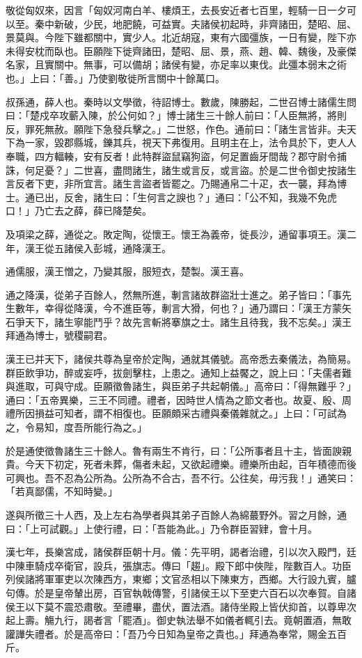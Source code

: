 \begin{pinyinscope}
敬從匈奴來，因言「匈奴河南白羊、樓煩王，去長安近者七百里，輕騎一日一夕可以至。秦中新破，少民，地肥饒，可益實。夫諸侯初起時，非齊諸田，楚昭、屈、景莫與。今陛下雖都關中，實少人。北近胡寇，東有六國彊族，一日有變，陛下亦未得安枕而臥也。臣願陛下徙齊諸田，楚昭、屈、景，燕、趙、韓、魏後，及豪傑名家，且實關中。無事，可以備胡；諸侯有變，亦足率以東伐。此彊本弱末之術也。」上曰：「善。」乃使劉敬徙所言關中十餘萬口。

叔孫通，薛人也。秦時以文學徵，待詔博士。數歲，陳勝起，二世召博士諸儒生問曰：「楚戍卒攻蘄入陳，於公何如？」博士諸生三十餘人前曰：「人臣無將，將則反，罪死無赦。願陛下急發兵擊之。」二世怒，作色。通前曰：「諸生言皆非。夫天下為一家，毀郡縣城，鑠其兵，視天下弗復用。且明主在上，法令具於下，吏人人奉職，四方輻輳，安有反者！此特群盜鼠竊狗盜，何足置齒牙間哉？郡守尉令捕誅，何足憂？」二世喜，盡問諸生，諸生或言反，或言盜。於是二世令御史按諸生言反者下吏，非所宜言。諸生言盜者皆罷之。乃賜通帛二十疋，衣一襲，拜為博士。通已出，反舍，諸生曰：「生何言之諛也？」通曰：「公不知，我幾不免虎口！」乃亡去之薛，薛已降楚矣。

及項梁之薛，通從之。敗定陶，從懷王。懷王為義帝，徙長沙，通留事項王。漢二年，漢王從五諸侯入彭城，通降漢王。

通儒服，漢王憎之，乃變其服，服短衣，楚製。漢王喜。

通之降漢，從弟子百餘人，然無所進，剸言諸故群盜壯士進之。弟子皆曰：「事先生數年，幸得從降漢，今不進臣等，剸言大猾，何也？」通乃謂曰：「漢王方蒙矢石爭天下，諸生寧能鬥乎？故先言斬將搴旗之士。諸生且待我，我不忘矣。」漢王拜通為博士，號稷嗣君。

漢王已并天下，諸侯共尊為皇帝於定陶，通就其儀號。高帝悉去秦儀法，為簡易。群臣飲爭功，醉或妄呼，拔劍擊柱，上患之。通知上益饜之，說上曰：「夫儒者難與進取，可與守成。臣願徵魯諸生，與臣弟子共起朝儀。」高帝曰：「得無難乎？」通曰：「五帝異樂，三王不同禮。禮者，因時世人情為之節文者也。故夏、殷、周禮所因損益可知者，謂不相復也。臣願頗采古禮與秦儀雜就之。」上曰：「可試為之，令易知，度吾所能行為之。」

於是通使徵魯諸生三十餘人。魯有兩生不肯行，曰：「公所事者且十主，皆面諛親貴。今天下初定，死者未葬，傷者未起，又欲起禮樂。禮樂所由起，百年積德而後可興也。吾不忍為公所為。公所為不合古，吾不行。公往矣，毋污我！」通笑曰：「若真鄙儒，不知時變。」

遂與所徵三十人西，及上左右為學者與其弟子百餘人為綿蕞野外。習之月餘，通曰：「上可試觀。」上使行禮，曰：「吾能為此。」乃令群臣習肄，會十月。

漢七年，長樂宮成，諸侯群臣朝十月。儀：先平明，謁者治禮，引以次入殿門，廷中陳車騎戍卒衛官，設兵，張旗志。傳曰「趨」。殿下郎中俠陛，陛數百人。功臣列侯諸將軍軍吏以次陳西方，東鄉；文官丞相以下陳東方，西鄉。大行設九賓，臚句傳。於是皇帝輦出房，百官執戟傳警，引諸侯王以下至吏六百石以次奉賀。自諸侯王以下莫不震恐肅敬。至禮畢，盡伏，置法酒。諸侍坐殿上皆伏抑首，以尊卑次起上壽。觴九行，謁者言「罷酒」。御史執法舉不如儀者輒引去。竟朝置酒，無敢讙譁失禮者。於是高帝曰：「吾乃今日知為皇帝之貴也。」拜通為奉常，賜金五百斤。


\end{pinyinscope}
